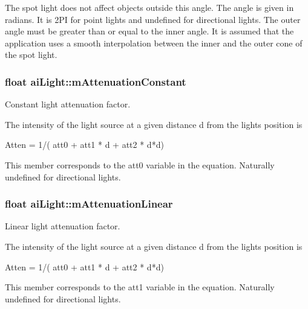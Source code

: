 The spot light does not affect objects outside this angle. The angle is given in radians. It is 2\+PI for point lights and undefined for directional lights. The outer angle must be greater than or equal to the inner angle. It is assumed that the application uses a smooth interpolation between the inner and the outer cone of the spot light. 
\subsubsection[{\texorpdfstring{m\+Attenuation\+Constant}{mAttenuationConstant}}]{\setlength{\rightskip}{0pt plus 5cm}float ai\+Light\+::m\+Attenuation\+Constant}\hypertarget{structai_light_ae8804b3c309527ca0f85d676bab55710}{}\label{structai_light_ae8804b3c309527ca0f85d676bab55710}
Constant light attenuation factor.

The intensity of the light source at a given distance \textquotesingle{}d\textquotesingle{} from the light\textquotesingle{}s position is 
\begin{DoxyCode}
Atten = 1/( att0 + att1 * d + att2 * d*d)
\end{DoxyCode}
 This member corresponds to the att0 variable in the equation. Naturally undefined for directional lights. 
\subsubsection[{\texorpdfstring{m\+Attenuation\+Linear}{mAttenuationLinear}}]{\setlength{\rightskip}{0pt plus 5cm}float ai\+Light\+::m\+Attenuation\+Linear}\hypertarget{structai_light_aefda311eaa785ea345782dfa95be817c}{}\label{structai_light_aefda311eaa785ea345782dfa95be817c}
Linear light attenuation factor.

The intensity of the light source at a given distance \textquotesingle{}d\textquotesingle{} from the light\textquotesingle{}s position is 
\begin{DoxyCode}
Atten = 1/( att0 + att1 * d + att2 * d*d)
\end{DoxyCode}
 This member corresponds to the att1 variable in the equation. Naturally undefined for directional lights. 
